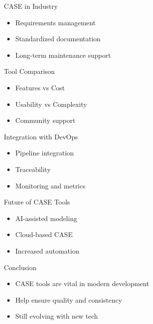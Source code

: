 \documentclass[aspectratio=169]{beamer}
\begin{document}
\begin{frame}{CASE in Industry}
  \begin{itemize}
    \item Requirements management
    \item Standardized documentation
    \item Long-term maintenance support
  \end{itemize}
\end{frame}

\begin{frame}{Tool Comparison}
  \begin{itemize}
    \item Features vs Cost
    \item Usability vs Complexity
    \item Community support
  \end{itemize}
\end{frame}

\begin{frame}{Integration with DevOps}
  \begin{itemize}
    \item Pipeline integration
    \item Traceability
    \item Monitoring and metrics
  \end{itemize}
\end{frame}

\begin{frame}{Future of CASE Tools}
  \begin{itemize}
    \item AI-assisted modeling
    \item Cloud-based CASE
    \item Increased automation
  \end{itemize}
\end{frame}

\begin{frame}{Conclusion}
  \begin{itemize}
    \item CASE tools are vital in modern development
    \item Help ensure quality and consistency
    \item Still evolving with new tech
  \end{itemize}
\end{frame}
\end{document}
